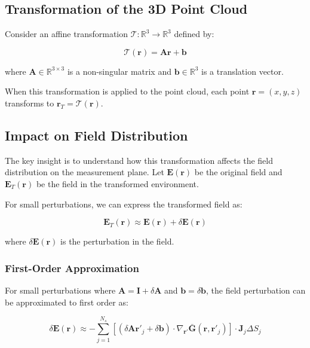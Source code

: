 \documentclass[12pt,a4paper]{article}
\begin{document}
\subsection{Transformation of the 3D Point Cloud}

Consider an affine transformation $\mathcal{T}: \mathbb{R}^3 \rightarrow \mathbb{R}^3$ defined by:

\begin{equation}
    \mathcal{T}(\mathbf{r}) = \mathbf{A}\mathbf{r} + \mathbf{b}
\end{equation}

where $\mathbf{A} \in \mathbb{R}^{3 \times 3}$ is a non-singular matrix and $\mathbf{b} \in \mathbb{R}^3$ is a translation vector.

When this transformation is applied to the point cloud, each point $\mathbf{r} = (x, y, z)$ transforms to $\mathbf{r}_T = \mathcal{T}(\mathbf{r})$.

\subsection{Impact on Field Distribution}

The key insight is to understand how this transformation affects the field distribution on the measurement plane. Let $\mathbf{E}(\mathbf{r})$ be the original field and $\mathbf{E}_T(\mathbf{r})$ be the field in the transformed environment.

For small perturbations, we can express the transformed field as:

\begin{equation}
    \mathbf{E}_T(\mathbf{r}) \approx \mathbf{E}(\mathbf{r}) + \delta\mathbf{E}(\mathbf{r})
\end{equation}

where $\delta\mathbf{E}(\mathbf{r})$ is the perturbation in the field.

\subsubsection{First-Order Approximation}

For small perturbations where $\mathbf{A} = \mathbf{I} + \delta\mathbf{A}$ and $\mathbf{b} = \delta\mathbf{b}$, the field perturbation can be approximated to first order as:

\begin{equation}
    \delta\mathbf{E}(\mathbf{r}) \approx -\sum_{j=1}^{N_s} \left[ (\delta\mathbf{A}\mathbf{r}'_j + \delta\mathbf{b}) \cdot \nabla_{\mathbf{r}'} \bar{\mathbf{G}}(\mathbf{r}, \mathbf{r}'_j) \right] \cdot \mathbf{J}_j \Delta S_j
\end{equation}
\end{document}
